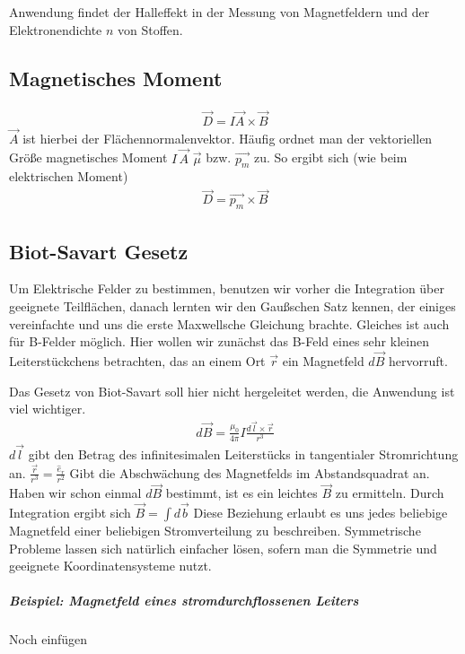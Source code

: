 Anwendung findet der Halleffekt in der Messung von Magnetfeldern und der Elektronendichte $n$ von Stoffen.

\subsection{Magnetisches Moment}
\begin{align} \label{eqn:Magnetisches Moment1}
\vec{D} = I \vec{A} \times \vec{B}
\end{align} $\vec{A}$ ist hierbei der Flächennormalenvektor. Häufig ordnet man der vektoriellen Größe magnetisches Moment $I \,\vec{A}$  $\vec{\mu}$ bzw. $\vec{p_m}$ zu. So ergibt sich (wie beim elektrischen Moment)
\begin{align} \label{eqn:Magnetisches Moment}
\boxed{\vec{D} = \vec{p_m} \times \vec{B}}
\end{align}

\subsection{Biot-Savart Gesetz}
Um Elektrische Felder zu bestimmen, benutzen wir vorher die Integration über geeignete Teilflächen, danach lernten wir den Gaußschen Satz kennen, der einiges vereinfachte und uns die erste Maxwellsche Gleichung brachte.
Gleiches ist auch für B-Felder möglich. Hier wollen wir zunächst das B-Feld eines sehr kleinen Leiterstückchens betrachten, das an einem Ort $\vec{r}$ ein Magnetfeld $d\vec{B}$ hervorruft. 

Das Gesetz von Biot-Savart soll hier nicht hergeleitet werden, die Anwendung ist viel wichtiger.
\begin{align} \label{eqn:Biot-Savart}
\boxed{d\vec{B} = \frac{\mu_0}{4\pi} I \frac{d\vec{l} \times \vec{r}}{r^3}}
\end{align}$d\vec{l}$ gibt den Betrag des infinitesimalen Leiterstücks in tangentialer Stromrichtung an. $\frac{\vec{r}}{r^3} = \frac{\hat{e}_r}{r^2}$ Gibt die Abschwächung des Magnetfelds im Abstandsquadrat an.   Haben wir schon einmal $d\vec{B}$ bestimmt, ist es ein leichtes $\vec{B}$ zu 
ermitteln.
Durch Integration ergibt sich $\vec{B} = \int d\vec{b}$ 
Diese Beziehung erlaubt es uns jedes beliebige Magnetfeld einer beliebigen Stromverteilung zu beschreiben. Symmetrische Probleme lassen sich natürlich einfacher lösen, sofern man die Symmetrie und geeignete Koordinatensysteme nutzt.
\subparagraph{Beispiel: Magnetfeld eines stromdurchflossenen Leiters}
Noch einfügen

